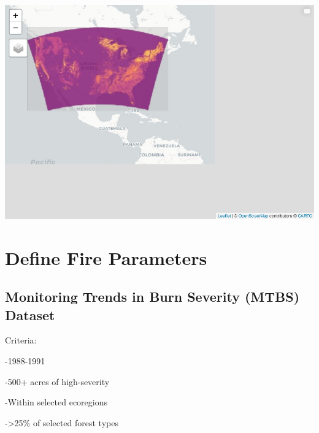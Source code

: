 \documentclass[
]{book}
\begin{document}
\includegraphics{_main_files/figure-latex/mapping ftype-1.pdf}

\hypertarget{define-fire-parameters}{%
\section{Define Fire Parameters}\label{define-fire-parameters}}

\hypertarget{monitoring-trends-in-burn-severity-mtbs-dataset}{%
\subsection{Monitoring Trends in Burn Severity (MTBS) Dataset}\label{monitoring-trends-in-burn-severity-mtbs-dataset}}

Criteria:

-1988-1991

-500+ acres of high-severity

-Within selected ecoregions

-\textgreater25\% of selected forest types
\end{document}
